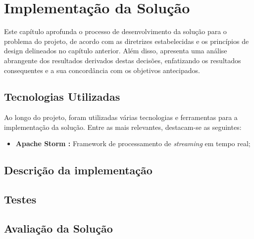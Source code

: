 \chapter{Implementação da Solução}
\label{sec:4-Implementacao}

Este capítulo aprofunda o processo de desenvolvimento da solução para o problema do
projeto, de acordo com as diretrizes estabelecidas e os princípios de design delineados no
capítulo anterior. Além disso, apresenta uma análise abrangente dos resultados derivados destas 
decisões, enfatizando os resultados consequentes e a sua concordância com os objetivos antecipados.

\section{Tecnologias Utilizadas}

Ao longo do projeto, foram utilizadas várias tecnologias e ferramentas para a implementação da solução.
Entre as mais relevantes, destacam-se as seguintes:

\begin{itemize}
  \item \textbf{Apache Storm \cite{storm}:} Framework de processamento de \textit{streaming} em tempo real;
\end{itemize}

\section{Descrição da implementação}


\section{Testes}


\section{Avaliação da Solução}

